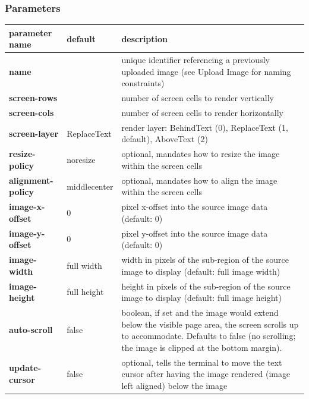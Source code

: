 \documentclass[a4paper]{article}
\begin{document}
\subsubsection*{Parameters}

\begin{tabular}{|m{3cm}|m{2cm}|m{10cm}|}
    \hline
    \textbf{parameter name}   & \textbf{default} & \textbf{description} \\
    \hline
    \textbf{name}             &                  & unique identifier referencing a previously uploaded image
                                                    (see Upload Image for naming constraints) \\
    \textbf{screen-rows}      &                  & number of screen cells to render vertically \\
    \textbf{screen-cols}      &                  & number of screen cells to render horizontally \\
    \textbf{screen-layer}     & ReplaceText      & render layer: BehindText (0), ReplaceText (1, default), AboveText (2) \\
    \textbf{resize-policy}    & noresize         & optional, mandates how to resize the image within the screen cells \\
    \textbf{alignment-policy} & middlecenter     & optional, mandates how to align the image within the screen cells \\
    \textbf{image-x-offset}   & 0                & pixel x-offset into the source image data (default: 0) \\
    \textbf{image-y-offset}   & 0                & pixel y-offset into the source image data (default: 0) \\
    \textbf{image-width}      & full width       & width in pixels of the sub-region of the source image to display (default: full image width) \\
    \textbf{image-height}     & full height      & height in pixels of the sub-region of the source image to display (default: full image height) \\
    \textbf{auto-scroll}      & false            & boolean, if set and the image would extend below the visible page area,
                                                    the screen scrolls up to accommodate.
                                                    Defaults to false (no scrolling; the image is clipped at the bottom margin). \\
    \textbf{update-cursor}    & false            & optional, tells the terminal to move the text cursor after having the image rendered (image left aligned) below the image \\

\end{tabular}
\end{document}

